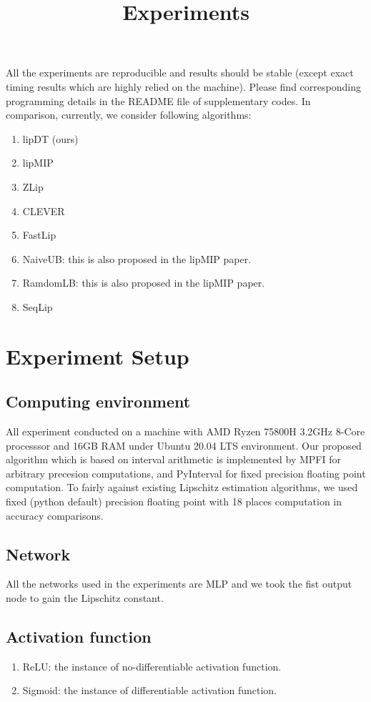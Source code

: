\documentclass[11pt]{article}
\title{Experiments}
\begin{document}
All the experiments are reproducible and results should be stable (except exact timing results which are highly relied on the machine). Please find corresponding programming details in the README file of supplementary codes. 
In comparison, currently, we consider following algorithms:
\begin{enumerate}
\item lipDT (ours)
\item lipMIP
\item ZLip
\item CLEVER
\item FastLip
\item NaiveUB: this is also proposed in the lipMIP paper.
\item RamdomLB: this is also proposed in the lipMIP paper.
\item SeqLip
\end{enumerate}



\section{Experiment Setup}
\subsection{Computing environment}
All experiment conducted on a machine with AMD Ryzen 75800H 3.2GHz 8-Core processsor and 16GB RAM under Ubuntu 20.04 LTS environment. Our proposed algorithm which is based on interval arithmetic is implemented by MPFI for arbitrary precesion computations, and PyInterval for fixed precision floating point computation. To fairly against existing Lipschitz estimation algorithms, we used fixed (python default) precision floating point with 18 places computation in accuracy comparisons.  

\subsection{Network}
All the networks used in the experiments are MLP and we took the fist output node to gain the Lipschitz constant.

\subsection{Activation function}
\begin{enumerate}
	\item ReLU: the instance of no-differentiable activation function.
	\item Sigmoid: the instance of differentiable activation function.
\end{enumerate}
\end{document}
